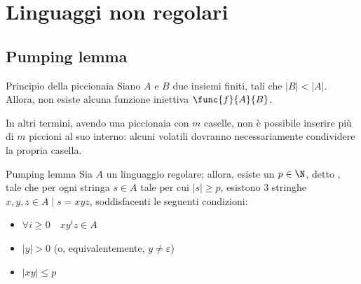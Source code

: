 \documentclass[a4paper, 12pt]{report}
\begin{document}
    \section{Linguaggi non regolari}

    \subsection{Pumping lemma}

    \begin{framedprinc}[label={pigeonhole}]{Principio della piccionaia}
        Siano $A$ e $B$ due insiemi finiti, tali che $|B| < |A|$. Allora, non esiste alcuna funzione iniettiva $\func{f}{A}{B}$.

        In altri termini, avendo una piccionaia con $m$ caselle, non è possibile inserire più di $m$ piccioni al suo interno: alcuni volatili dovranno necessariamente condividere la propria casella.
    \end{framedprinc}

    \begin{framedlem}{Pumping lemma}
        Sia $A$ un linguaggio regolare; allora, esiste un $p \in \N$, detto , tale che per ogni stringa $s \in A$ tale per cui $|s| \ge p$, esistono 3 stringhe $x, y, z \in A \mid s = xyz$, soddisfacenti le seguenti condizioni:

        \begin{itemize}
            \item $\forall i \ge 0 \quad xy^iz \in A$
            \item $|y| > 0$ (o, equivalentemente, $y \neq \varepsilon$)
            \item $|xy| \le p$
        \end{itemize}
    \end{framedlem}
\end{document}

